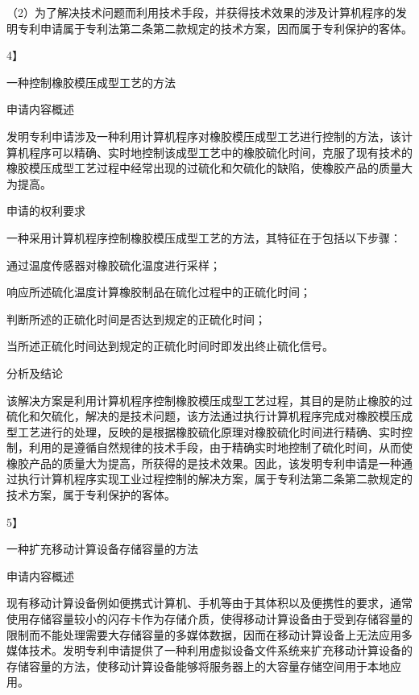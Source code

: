 {\setlength{\parindent}{17.1bp}（2）为了解决技术问题而利用技术手段，并获得技术效果的涉及计算机程序的发明专利申请属于专利法第二条第二款规定的技术方案，因而属于专利保护的客体。\par}

{4】\par}

一种控制橡胶模压成型工艺的方法

{\setlength{\parindent}{22.5bp}申请内容概述\par}

发明专利申请涉及一种利用计算机程序对橡胶模压成型工艺进行控制的方法，该计算机程序可以精确、实时地控制该成型工艺中的橡胶硫化时间，克服了现有技术的橡胶模压成型工艺过程中经常出现的过硫化和欠硫化的缺陷，使橡胶产品的质量大为提高。

{\setlength{\parindent}{22.5bp}申请的权利要求\par}

一种采用计算机程序控制橡胶模压成型工艺的方法，其特征在于包括以下步骤：

通过温度传感器对橡胶硫化温度进行采样；

响应所述硫化温度计算橡胶制品在硫化过程中的正硫化时间；

判断所述的正硫化时间是否达到规定的正硫化时间；

当所述正硫化时间达到规定的正硫化时间时即发出终止硫化信号。

{\setlength{\parindent}{22.5bp}分析及结论\par}

该解决方案是利用计算机程序控制橡胶模压成型工艺过程，其目的是防止橡胶的过硫化和欠硫化，解决的是技术问题，该方法通过执行计算机程序完成对橡胶模压成型工艺进行的处理，反映的是根据橡胶硫化原理对橡胶硫化时间进行精确、实时控制，利用的是遵循自然规律的技术手段，由于精确实时地控制了硫化时间，从而使橡胶产品的质量大为提高，所获得的是技术效果。因此，该发明专利申请是一种通过执行计算机程序实现工业过程控制的解决方案，属于专利法第二条第二款规定的技术方案，属于专利保护的客体。

{5】\par}

一种扩充移动计算设备存储容量的方法

{\setlength{\parindent}{22.5bp}申请内容概述\par}

现有移动计算设备例如便携式计算机、手机等由于其体积以及便携性的要求，通常使用存储容量较小的闪存卡作为存储介质，使得移动计算设备由于受到存储容量的限制而不能处理需要大存储容量的多媒体数据，因而在移动计算设备上无法应用多媒体技术。发明专利申请提供了一种利用虚拟设备文件系统来扩充移动计算设备的存储容量的方法，使移动计算设备能够将服务器上的大容量存储空间用于本地应用。

